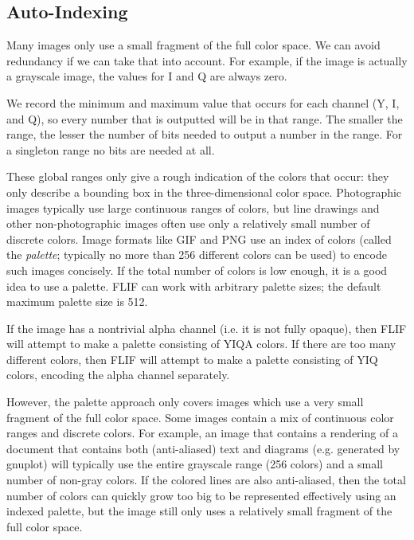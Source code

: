 \documentclass[a4paper,USenglish]{lipics}
\begin{document}


\subsection{Auto-Indexing}
\label{sec:auto-indexing}

Many images only use a small fragment of the full color space. We can avoid redundancy
if we can take that into account. For example, if the image is actually a grayscale image,
the values for I and Q are always zero.

We record the minimum and maximum value that occurs for each channel (Y, I, and Q), so every number that
is outputted will be in that range. The smaller the range, the lesser the number of bits
needed to output a number in the range. For a singleton range no bits are needed at all.

These global ranges only give a rough indication of the colors that occur: they only describe
a bounding box in the three-dimensional color space.
Photographic images typically use large continuous ranges of colors, but line drawings
and other non-photographic images often use only a relatively small number of discrete colors.
Image formats like GIF and PNG use an index of colors (called the {\it palette}; typically no more
than 256 different colors can be used) to encode such images concisely.
If the total number of colors is low enough, it is a good idea to use a palette.
FLIF can work with arbitrary palette sizes; the default maximum palette size is 512.

If the image has a nontrivial alpha channel (i.e. it is not fully opaque), then FLIF will attempt
to make a palette consisting of YIQA colors. If there are too many different colors, then FLIF
will attempt to make a palette consisting of YIQ colors, encoding the alpha channel separately.

However, the palette approach only covers images which use a very small fragment of the full color space.
Some images contain a mix of continuous color ranges and discrete colors. For example, an
image that contains a rendering of a document that contains both (anti-aliased) text and
diagrams (e.g. generated by gnuplot)
will typically use the entire grayscale range (256 colors) and a small number of non-gray colors.
If the colored lines are also anti-aliased, then the total number of colors can quickly grow too
big to be represented effectively using an indexed palette, but the image still only uses a relatively small
fragment of the full color space.
\end{document}
